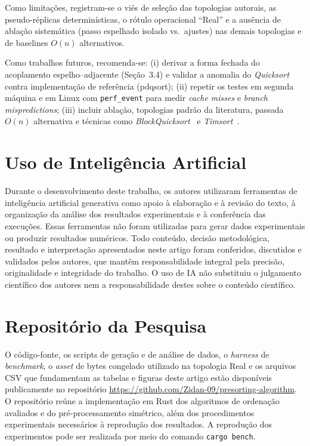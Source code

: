 \documentclass[portuguese]{sbc2025}%
\begin{document}
Como limitações, registram-se o viés de seleção das topologias autorais, as pseudo-réplicas determinísticas, o rótulo operacional ``Real'' e a ausência de ablação sistemática (passo espelhado isolado vs.\ ajustes) nas demais topologias e de baselines $O(n)$ alternativos.

Como trabalhos futuros, recomenda-se: (i) derivar a forma fechada do acoplamento espelho--adjacente (Seção~3.4) e validar a anomalia do \emph{Quicksort} contra implementação de referência (pdqsort); (ii) repetir os testes em segunda máquina e em Linux com \texttt{perf\_event} para medir \emph{cache misses} e \emph{branch mispredictions}; (iii) incluir ablação, topologias padrão da literatura, passada $O(n)$ alternativa e técnicas como \emph{BlockQuicksort}~\citep{edelkamp_blockquicksort_2016} e \emph{Timsort}~\citep{auger_timsort_2018}.

\section{Uso de Inteligência Artificial}\label{sec:ia}

Durante o desenvolvimento deste trabalho, os autores utilizaram ferramentas de inteligência artificial generativa como apoio à elaboração e à revisão do texto, à organização da análise dos resultados experimentais e à conferência das execuções. Essas ferramentas não foram utilizadas para gerar dados experimentais ou produzir resultados numéricos. Todo conteúdo, decisão metodológica, resultado e interpretação apresentados neste artigo foram conferidos, discutidos e validados pelos autores, que mantêm responsabilidade integral pela precisão, originalidade e integridade do trabalho. O uso de IA não substituiu o julgamento científico dos autores nem a responsabilidade destes sobre o conteúdo científico.

\section{Repositório da Pesquisa}\label{sec:repositorio}

O código-fonte, os scripts de geração e de análise de dados, o \emph{harness} de \emph{benchmark}, o \emph{asset} de bytes congelado utilizado na topologia Real e os arquivos CSV que fundamentam as tabelas e figuras deste artigo estão disponíveis publicamente no repositório \url{https://github.com/Zidan-09/presorting-algorithm}. O repositório reúne a implementação em Rust dos algoritmos de ordenação avaliados e do pré-processamento simétrico, além dos procedimentos experimentais necessários à reprodução dos resultados. A reprodução dos experimentos pode ser realizada por meio do comando \texttt{cargo bench}.
\end{document}
